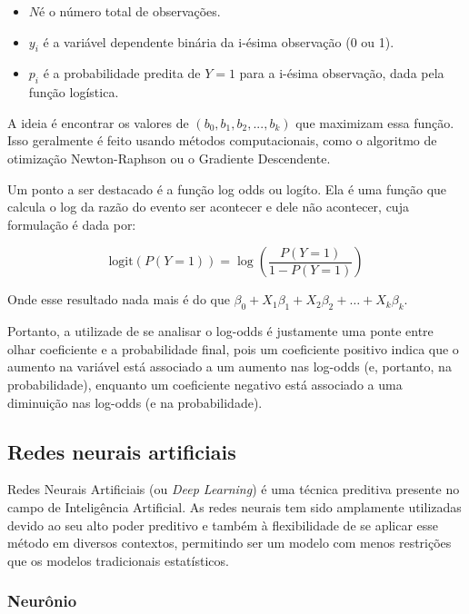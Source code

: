 \begin{itemize}
  \item  $N$é o número total de observações.
  \item  $y_i$ é a variável dependente binária da i-ésima observação (0 ou 1).
  \item $p_i$ é a probabilidade predita de $Y=1$ para a i-ésima observação, dada pela função logística.
\end{itemize}

A ideia é encontrar os valores de $(b_0, b_1, b_2, ..., b_k)$ que maximizam essa função. Isso geralmente é feito usando métodos computacionais, 
como o algoritmo de otimização Newton-Raphson ou o Gradiente Descendente.

Um ponto a ser destacado é a função log odds ou logíto. Ela é uma função que calcula o log da 
razão do evento ser acontecer e dele não acontecer, cuja formulação é dada por:

\begin{equation}
  \text{logit}(P(Y=1)) = \log \left( \frac{P(Y=1)}{1 - P(Y=1)} \right)
\end{equation}

Onde esse resultado nada mais é do que $\beta_0 + X_{1}\beta_1 + X_{2}\beta_2 + \ldots +X_{k}\beta_k$. 

Portanto, a utilizade de se analisar o log-odds é justamente uma ponte entre olhar coeficiente e a probabilidade final, 
pois um coeficiente positivo indica que o aumento na variável está associado a um aumento nas log-odds 
(e, portanto, na probabilidade), enquanto um coeficiente negativo está associado a uma diminuição nas log-odds (e na probabilidade).


\subsection{Redes neurais artificiais}

Redes Neurais Artificiais (ou \textit{Deep Learning}) é uma técnica preditiva presente no campo de Inteligência Artificial. As redes neurais tem sido amplamente utilizadas devido ao seu alto poder preditivo e também à flexibilidade de se aplicar esse método em diversos contextos, permitindo ser um modelo com menos restrições que os modelos tradicionais estatísticos.


\subsubsection{Neurônio}

